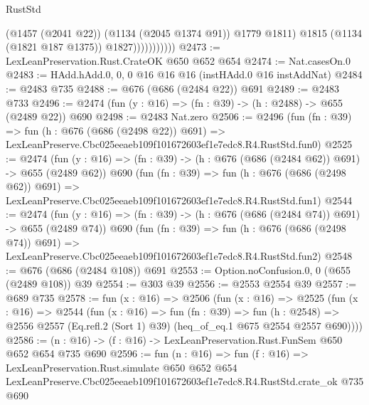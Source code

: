 \begin{lexlean}{RustStd}
\begin{coremodule}
                            (@1457 (@2041 @22))
                            (@1134 (@2045 @1374 @91))
                            @1779
                            @1811)
                          @1815
                          (@1134 (@1821 @187 @1375))
                          @1827)))))))))))
@2473 := LexLeanPreservation.Rust.CrateOK @650 @652 @654
@2474 := Nat.casesOn.{0}
@2483 := HAdd.hAdd.{0, 0, 0} @16 @16 @16 (instHAdd.{0} @16 instAddNat)
@2484 := @2483 @735
@2488 := @676 (@686 (@2484 @22)) @691
@2489 := @2483 @733
@2496 := @2474 (fun (y : @16) => (fn : @39) -> (h : @2488) -> @655 (@2489 @22)) @690
@2498 := @2483 Nat.zero
@2506 := @2496
    (fun (fn : @39) =>
    fun (h : @676 (@686 (@2498 @22)) @691) =>
    LexLeanPreserve.Cbc025eeaeb109f101672603ef1e7edc8.R4.RustStd.fun0)
@2525 := @2474
    (fun (y : @16) => (fn : @39) -> (h : @676 (@686 (@2484 @62)) @691) -> @655 (@2489 @62))
    @690
    (fun (fn : @39) =>
    fun (h : @676 (@686 (@2498 @62)) @691) =>
    LexLeanPreserve.Cbc025eeaeb109f101672603ef1e7edc8.R4.RustStd.fun1)
@2544 := @2474
    (fun (y : @16) => (fn : @39) -> (h : @676 (@686 (@2484 @74)) @691) -> @655 (@2489 @74))
    @690
    (fun (fn : @39) =>
    fun (h : @676 (@686 (@2498 @74)) @691) =>
    LexLeanPreserve.Cbc025eeaeb109f101672603ef1e7edc8.R4.RustStd.fun2)
@2548 := @676 (@686 (@2484 @108)) @691
@2553 := Option.noConfusion.{0, 0} (@655 (@2489 @108)) @39
@2554 := @303 @39
@2556 := @2553 @2554 @39
@2557 := @689 @735
@2578 := fun (x : @16) =>
  @2506
    (fun (x : @16) =>
    @2525
      (fun (x : @16) =>
      @2544
        (fun (x : @16) =>
        fun (fn : @39) =>
        fun (h : @2548) =>
        @2556 @2557 (Eq.refl.{2} (Sort 1) @39) (heq_of_eq.{1} @675 @2554 @2557 @690))))
@2586 := (n : @16) -> (f : @16) -> LexLeanPreservation.Rust.FunSem @650 @652 @654 @735 @690
@2596 := fun (n : @16) =>
  fun (f : @16) =>
  LexLeanPreservation.Rust.simulate
    @650
    @652
    @654
    LexLeanPreserve.Cbc025eeaeb109f101672603ef1e7edc8.R4.RustStd.crate_ok
    @735
    @690
\end{coremodule}
\end{lexlean}
